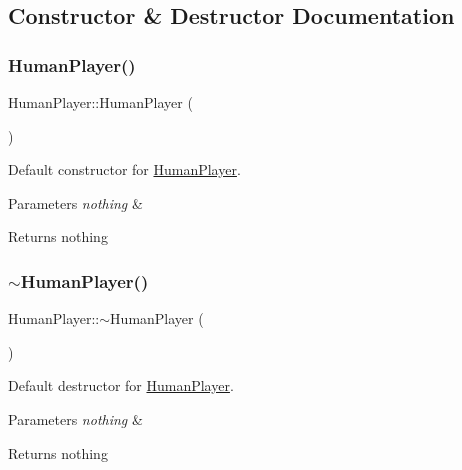 \subsection{Constructor \& Destructor Documentation}
\mbox{\label{classHumanPlayer_a1cae7389c9855d4ec4e8f69cbe37e372}} 
\subsubsection{\texorpdfstring{Human\+Player()}{HumanPlayer()}}
{\footnotesize\ttfamily Human\+Player\+::\+Human\+Player (\begin{DoxyParamCaption}{ }\end{DoxyParamCaption})}



Default constructor for \mbox{\hyperlink{classHumanPlayer}{Human\+Player}}. 


\begin{DoxyParams}{Parameters}
{\em nothing} & \\
\hline
\end{DoxyParams}
\begin{DoxyReturn}{Returns}
nothing 
\end{DoxyReturn}
\mbox{\label{classHumanPlayer_abdeb9d120fc74c8d82ec0c688883f16f}} 
\subsubsection{\texorpdfstring{$\sim$\+Human\+Player()}{~HumanPlayer()}}
{\footnotesize\ttfamily Human\+Player\+::$\sim$\+Human\+Player (\begin{DoxyParamCaption}{ }\end{DoxyParamCaption})\hspace{0.3cm}{\ttfamily [virtual]}}



Default destructor for \mbox{\hyperlink{classHumanPlayer}{Human\+Player}}. 


\begin{DoxyParams}{Parameters}
{\em nothing} & \\
\hline
\end{DoxyParams}
\begin{DoxyReturn}{Returns}
nothing 
\end{DoxyReturn}


